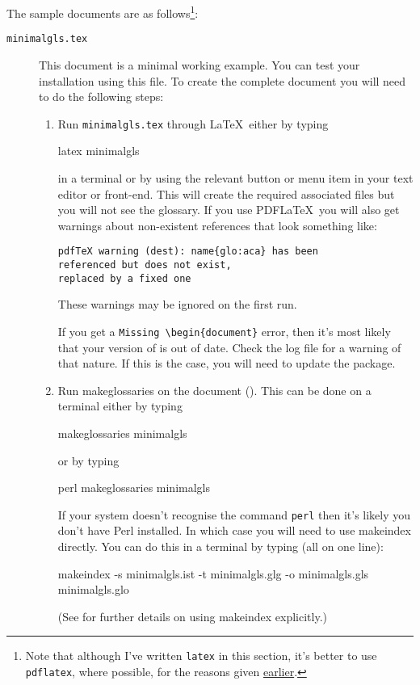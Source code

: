 \documentclass[report,inlinetitle,widecs]{nlctdoc}
\newcounter{sample}
\newcommand{\exitem}[2][sample]{%
  \item[\texttt{#1#2.tex}]%
  \refstepcounter{sample}\label{ex:#1#2}}
\newenvironment{samplelist}%
{\begin{description}}%
{\end{description}}
\begin{document}
The sample documents are as follows\footnote{Note that although I've written
\texttt{latex} in this section, it's better to use \texttt{pdflatex}, where
possible, for the reasons given \hyperlink{pdflatexnote}{earlier}.}:
\begin{samplelist}
\exitem[minimal]{gls} This document is a
minimal working example. You can test your installation using this
file. To create the complete document you will need to do the
following steps:
  \begin{enumerate}
  \item Run \texttt{minimalgls.tex} through \LaTeX\ either by 
  typing
\begin{prompt}
latex minimalgls
\end{prompt}
  in a terminal or by using the relevant button or menu item in
  your text editor or front-end. This will create the required 
  associated files but you will not see the glossary. If you use 
  PDF\LaTeX\ you will also get warnings about non-existent 
  references that look something like:
\begin{verbatim}
pdfTeX warning (dest): name{glo:aca} has been 
referenced but does not exist, 
replaced by a fixed one
\end{verbatim}
  These warnings may be ignored on the first run.

  If you get a \verb"Missing \begin{document}" error, then 
  it's most likely that your version of  is 
  out of date. Check the log file for a warning of that nature. 
  If this is the case, you will need to update the 
  package.

  \item Run \gls{makeglossaries} on the document (). This can
  be done on a terminal either by typing
\begin{prompt}
makeglossaries minimalgls
\end{prompt}
  or by typing
\begin{prompt}
perl makeglossaries minimalgls
\end{prompt}
  If your system doesn't recognise the command \texttt{perl} then
  it's likely you don't have Perl installed. In which case you
  will need to use \gls{makeindex} directly. You can do this
  in a terminal by typing (all on one line):
\begin{prompt}
makeindex -s minimalgls.ist -t minimalgls.glg -o minimalgls.gls minimalgls.glo
\end{prompt}
  (See  for further details on using 
   \gls*{makeindex} explicitly.)


\end{enumerate}
\end{samplelist}
\end{document}
